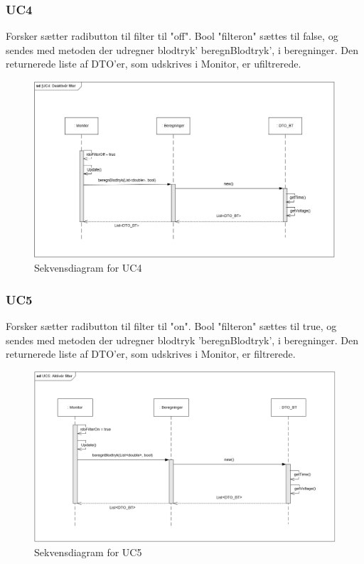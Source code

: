 \subsubsection{UC4}
Forsker sætter radibutton til filter til "off".
Bool "filteron" sættes til false, og sendes med metoden der udregner blodtryk' beregnBlodtryk', i beregninger. Den returnerede liste af DTO'er, som udskrives i Monitor, er ufiltrerede.

\begin{figure}[H]
	\centering
	\includegraphics[width=1\textwidth]{Figurer/UC4_SD_SW}
	\caption{Sekvensdiagram for UC4}
\end{figure}

\subsubsection{UC5}
Forsker sætter radibutton til filter til "on".
Bool "filteron" sættes til true, og sendes med metoden der udregner blodtryk 'beregnBlodtryk', i beregninger. Den returnerede liste af DTO'er, som udskrives i Monitor, er filtrerede.

\begin{figure}[H]
	\centering
	\includegraphics[width=1\textwidth]{Figurer/UC5_SD_SW}
	\caption{Sekvensdiagram for UC5}
\end{figure}

